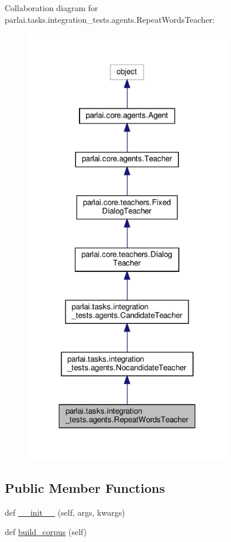 Collaboration diagram for parlai.\+tasks.\+integration\+\_\+tests.\+agents.\+Repeat\+Words\+Teacher\+:
\nopagebreak
\begin{figure}[H]
\begin{center}
\leavevmode
\includegraphics[width=254pt]{classparlai_1_1tasks_1_1integration__tests_1_1agents_1_1RepeatWordsTeacher__coll__graph}
\end{center}
\end{figure}
\subsection*{Public Member Functions}
\begin{DoxyCompactItemize}
\item 
def \hyperlink{classparlai_1_1tasks_1_1integration__tests_1_1agents_1_1RepeatWordsTeacher_a169b9a70cebc4aeb54e4b90ddba644ac}{\+\_\+\+\_\+init\+\_\+\+\_\+} (self, args, kwargs)
\item 
def \hyperlink{classparlai_1_1tasks_1_1integration__tests_1_1agents_1_1RepeatWordsTeacher_ad03d8fb602aca6baf0b62f633b3bb54c}{build\+\_\+corpus} (self)
\end{DoxyCompactItemize}
